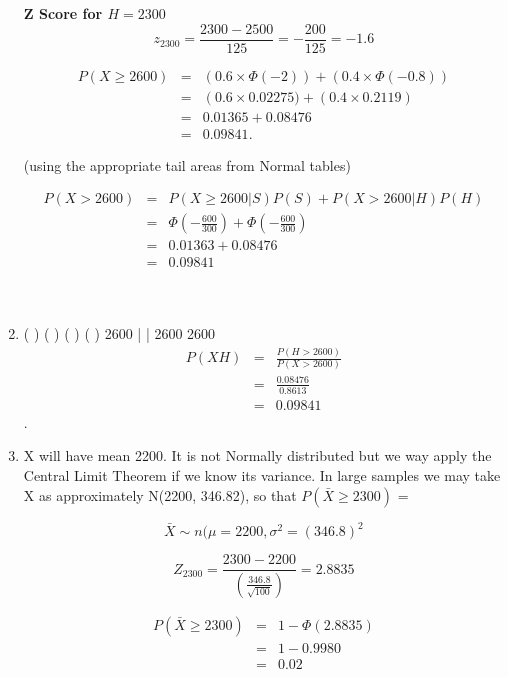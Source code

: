 \documentclass[a4paper,12pt]{article}
\begin{document}
\begin{enumerate}
\begin{framed}
\noindent \textbf{Z Score for $H = 2300$}
\[z_{2300}  = \frac{2300 - 2500}{125}  = -\frac{200}{125} = -1.6\]
\end{framed}

\begin{eqnarray*} 
P(X \geq 2600) &=& \left(0.6 \times \Phi(-2)\right) + \left(0.4 \times \Phi(-0.8)\right)\\
&=& \left(0.6 \times 0.02275) + \left(0.4 \times 0.2119\right)\\
 &=& 0.01365 + 0.08476 \\ 
 &=& 0.09841.
\end{eqnarray*}

(using the appropriate tail areas from Normal tables)





\begin{eqnarray*}
P(X > 2600) &=& P(X \geq 2600|S)P(S) + P(X > 2600|H)P(H) \\
 &=& \Phi \left( - \frac{600}{300}\right) + \Phi \left( - \frac{600}{300}\right) \\
 &=& 0.01363 + 0.08476 \\
 &=& 0.09841 \\
\end{eqnarray*}

   
\item  ( ) ( ) ( )
( )
2600 |  | 2600 
2600 
\begin{eqnarray*}
P (X H) &=& \frac{P(H>2600)}{P(X>2600)}\\

&=& \frac{0.08476}{0.8613}\\
&=& 0.09841
\end{eqnarray*}.

\item X will have mean 2200. It is not Normally distributed but we way
apply the Central Limit Theorem if we know its variance. In large samples we
may take X as approximately N(2200, 346.82), so that $P(\bar{X}\geq 2300)$ = 
  
\[\bar{X} \sim n(\mu = 2200, \sigma^2 = (346.8)^2\]
               
 \[Z_{2300}  =   \frac{2300-2200}{       \left(\frac{346.8}{\sqrt{100}} \right)} = 2.8835\]



\begin{eqnarray*} 
P(\bar{X}\geq 2300) &=& 1- \Phi(2.8835)\\  &=& 1- 0.9980 \\&=& 0.02
\end{eqnarray*}

\end{enumerate}

  

                                              
\end{document}
